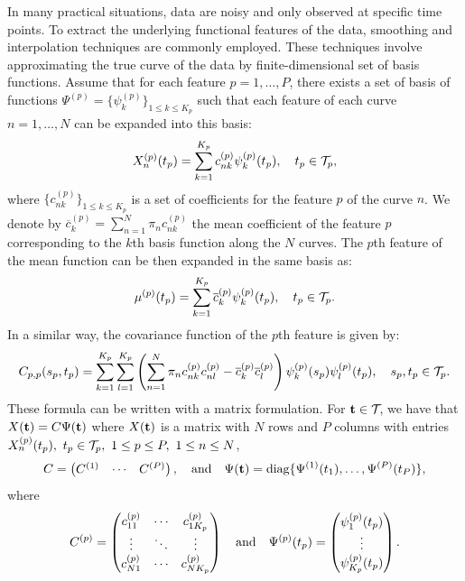 In many practical situations, data are noisy and only observed at specific time points. To extract the underlying functional features of the data, smoothing and interpolation techniques are commonly employed. These techniques involve approximating the true curve of the data by finite-dimensional set of basis functions. Assume that for each feature $p = 1, \dots, P$, there exists a set of basis of functions $\Psi^{(p)} = \{\psi_k^{(p)}\}_{1 \leq k \leq K_p}$ such that each feature of each curve $n = 1, \dots, N$ can be expanded into this basis:
\begin{equation}\label{eq:curve_basis_expansion}
X_n^{(p)}(t_p) = \sum_{k = 1}^{K_p} c^{(p)}_{nk}\psi_k^{(p)}(t_p), \quad t_p \in \mathcal{T}_{p},
\end{equation}
where $\{c^{(p)}_{nk}\}_{1 \leq k \leq K_p}$ is a set of coefficients for the feature $p$ of the curve $n$. We denote by $\overline{c}_k^{(p)} = \sum_{n = 1}^N \pi_n c^{(p)}_{nk}$ the mean coefficient of the feature $p$ corresponding to the $k$th basis function along the $N$ curves.
The $p$th feature of the mean function can be then expanded in the same basis as:
\begin{equation}
    \mu^{(p)}(t_p) = \sum_{k = 1}^{K_p} \overline{c}_k^{(p)}\psi_k^{(p)}(t_p), \quad t_p \in \mathcal{T}_{p}.
\end{equation}
In a similar way, the covariance function of the $p$th feature is given by:
\begin{equation}
    C_{p,p}(s_p, t_p) = \sum_{k = 1}^{K_p} \sum_{l = 1}^{K_p} \left(\sum_{n = 1}^N \pi_n c^{(p)}_{nk}c^{(p)}_{nl} - \overline{c}_k^{(p)}\overline{c}_l^{(p)}\right)\psi_k^{(p)}(s_p)\psi_l^{(p)}(t_p), \quad s_p, t_p \in \mathcal{T}_{p}.
\end{equation}
These formula can be written with a matrix formulation. For $\mathbf{t} \in \mathcal{T}_{}$, we have that $X(\mathbf{t}) = C\Psi(\mathbf{t})$ where $X(\mathbf{t})$ is a matrix with $N$ rows and $P$ columns with entries $X_n^{(p)}(t_p),~t_p \in \mathcal{T}_{p},~1 \leq p \leq P,~1 \leq n \leq N$,
\begin{equation}
    C = \begin{pmatrix}
            C^{(1)} & \cdots & C^{(P)} \\
        \end{pmatrix}, \quad \text{and}\quad
    \Psi(\mathbf{t}) = \text{diag}\{\Psi^{(1)}(t_1), \dots, \Psi^{(P)}(t_P)\},
\end{equation}
where
\begin{equation}
C^{(p)} = \begin{pmatrix}
    c^{(p)}_{11} & \cdots & c^{(p)}_{1K_p} \\
    \vdots & \ddots & \vdots \\
    c^{(p)}_{N1} & \cdots & c^{(p)}_{NK_p}
\end{pmatrix} \\
\quad \text{and}\quad
\Psi^{(p)}(t_p) = \begin{pmatrix}
    \psi_1^{(p)}(t_p) \\
    \vdots \\
    \psi_{K_p}^{(p)}(t_p)
\end{pmatrix}.
\end{equation}
